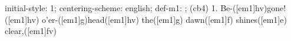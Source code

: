 initial-style: 1;
centering-scheme: english;
def-m1: \grealign;
(cb4) 1. Be-([em1]hv)gone!([em1]hv) o'er-([em1]g)head([em1]hv) the([em1]g) dawn([em1]f) shines([em1]e) clear,([em1]fv)